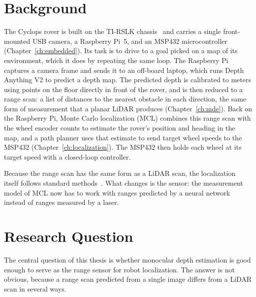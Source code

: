 \section{Background}

The Cyclops rover is built on the TI-RSLK chassis~\cite{ti_rslk_max} and carries a single
front-mounted USB camera, a Raspberry Pi~5, and an MSP432 microcontroller
(Chapter~\ref{ch:embedded}). Its task is to drive to a goal picked on a map of its environment,
which it does by repeating the same loop. The Raspberry Pi captures a camera frame and sends it to
an off-board laptop, which runs Depth Anything V2 to predict a depth map. The predicted depth is
calibrated to meters using points on the floor directly in front of the rover, and is then reduced
to a range scan: a list of distances to the nearest obstacle in each direction, the same form of
measurement that a planar LiDAR produces (Chapter~\ref{ch:mde}). Back on the Raspberry Pi, Monte
Carlo localization (MCL) combines this range scan with the wheel encoder counts to estimate the
rover's position and heading in the map, and a path planner uses that estimate to send target
wheel speeds to the MSP432 (Chapter~\ref{ch:localization}). The MSP432 then holds each wheel at its
target speed with a closed-loop controller.

Because the range scan has the same form as a LiDAR scan, the localization itself follows standard
methods~\cite{thrun2005probabilistic}. What changes is the sensor: the measurement model of MCL now
has to work with ranges predicted by a neural network instead of ranges measured by a laser.

\section{Research Question}
\label{sec:research-question}

The central question of this thesis is whether monocular depth estimation is good enough to serve
as the range sensor for robot localization. The answer is not obvious, because a range scan
predicted from a single image differs from a LiDAR scan in several ways.

